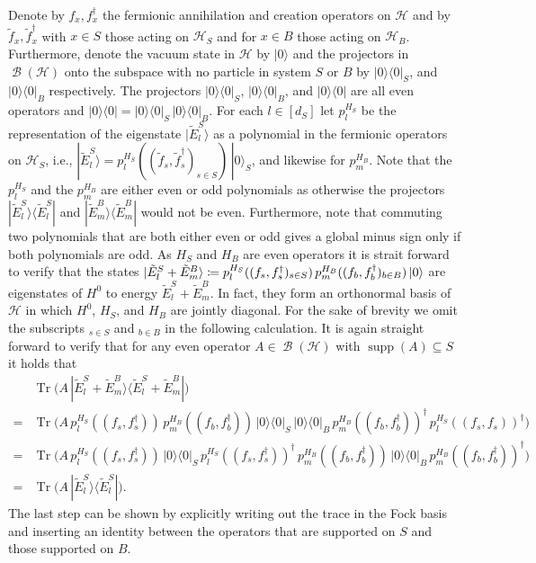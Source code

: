 \documentclass[a4paper,12pt,listof=totoc,index=totoc,bibliography=totoc,headsepline=false,headings=normal,BCOR16.153846mm,DIV12,headinclude,twoside,cleardoublepage=empty,numbers=noenddot,final]{scrreprt}
\theoremstyle{mystyle}
\numberwithin{equation}{section}
\numberwithin{figure}{section}
\numberwithin{lemma}{section}
\numberwithin{theorem}{section}
\numberwithin{corollary}{section}
\numberwithin{definition}{section}
\numberwithin{conjecture}{section}
\numberwithin{observation}{section}
\newcommand{\+}{\mkern2mu}
\newcommand{\coloneqq}{\mathrel{\vcentcolon\mkern-1.2mu=}} %
\renewcommand{\H}{H}
\newcommand{\bra}[1]{\langle #1|}
\newcommand{\ket}[1]{|#1\rangle}
\newcommand{\ketbra}[2]{\ket{#1}\!\bra{#2}}
\newcommand{\ad}{^\dagger}
\DeclareMathOperator{\1}{\mathds{1}}
\DeclareMathOperator{\Bop}{\mathcal{B}}
\DeclareMathOperator{\Tr}{Tr}
\DeclareMathOperator{\supp}{supp}
\newcommand{\mc}[1]{\mathcal{#1}}
\newcommand{\mcH}{\mc{H}}
\begin{document}
Denote by $f_x,f\ad_x$ the fermionic annihilation and creation operators on $\mcH$ and by $\tilde f_x, \tilde f\ad_x$ with $x \in S$ those acting on $\mcH_S$ and for $x \in B$ those acting on $\mcH_B$.
Furthermore, denote the vacuum state in $\mcH$ by $\ket{0}$ and the projectors in $\Bop(\mcH)$ onto the subspace with no particle in system $S$ or $B$ by $\ketbra{0}{0}_S$, and $\ketbra{0}{0}_B$ respectively.
The projectors $\ketbra{0}{0}_S$, $\ketbra{0}{0}_B$, and $\ketbra{0}{0}$ are all even operators and $\ketbra{0}{0} = \ketbra{0}{0}_S\,\ketbra{0}{0}_B$.
For each $l \in [d_S]$ let $p^{\H_S}_l$ be the representation of the eigenstate $\ket{\tilde E^S_l}$ as a polynomial in the fermionic operators on $\mcH_S$, i.e., $\ket{\tilde E^S_l} = p^{\H_S}_l((\tilde f_s,\tilde f\ad_s)_{s\in S})\,\ket{0}_S$, and likewise for $p^{\H_B}_m$.
Note that the $p^{\H_S}_l$ and the $p^{\H_B}_m$ are either even or odd polynomials as otherwise the projectors $\ketbra{\tilde E^S_l}{\tilde E^S_l}$ and $\ketbra{\tilde E^B_m}{\tilde E^B_m}$ would not be even.
Furthermore, note that commuting two polynomials that are both either even or odd gives a global minus sign only if both polynomials are odd.
As $\H_S$ and $\H_B$ are even operators it is strait forward to verify that the states $\ket{\tilde E^S_l + \tilde E^B_m} \coloneqq p^{\H_S}_l((f_s,f\ad_s)_{s\in S})\,p^{\H_B}_m((f_b,f\ad_b)_{b\in B})\,\ket{0}$ are eigenstates of $\H^0$ to energy $\tilde E^S_l + \tilde E^B_m$.
In fact, they form an orthonormal basis of $\mcH$ in which $\H^0$, $\H_S$, and $\H_B$ are jointly diagonal.
For the sake of brevity we omit the subscripts $_{s\in S}$ and $_{b\in B}$ in the following calculation.
It is again straight forward to verify that for any even operator $A \in \Bop(\mcH)$ with $\supp(A) \subseteq S$ it holds that
\begin{align}
  &\Tr\big(A\,\ketbra{\tilde E^S_l + \tilde E^B_m}{\tilde E^S_l + \tilde E^B_m}\big) \\
  = &\Tr\big(A\, p^{\H_S}_l((f_s,f\ad_s))\,p^{\H_B}_m((f_b,f\ad_b))\,\ketbra{0}{0}_S\,\ketbra{0}{0}_B\,p^{\H_B}_m((f_b,f\ad_b))\ad\,p^{\H_S}_l((f_s,f_s))\ad \big) \nonumber \\
  = &\Tr\big(A\, p^{\H_S}_l((f_s,f\ad_s))\,\ketbra{0}{0}_S\,p^{\H_S}_l((f_s,f\ad_s))\ad\,p^{\H_B}_m((f_b,f\ad_b))\,\ketbra{0}{0}_B\,p^{\H_B}_m((f_b,f\ad_b))\ad \big) \nonumber \\
  = &\Tr\big(A\,\ketbra{\tilde E^S_l}{\tilde E^S_l} \big) .
\end{align}
The last step can be shown by explicitly writing out the trace in the Fock basis and inserting an identity between the operators that are supported on $S$ and those supported on $B$.
\end{document}
